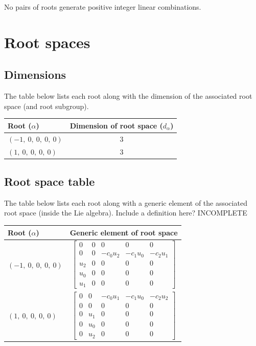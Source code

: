 \documentclass[11pt]{article}
\newcommand{\noi}{\noindent}
\theoremstyle{definition}
\begin{document}
\noindent No pairs of roots generate positive integer linear combinations.


\newpage
\section{Root spaces}

\subsection{Dimensions}

The table below lists each root along with the dimension of the associated root space (and root subgroup).

\bigskip

\noindent \begin{tabular}{|l|c|}
    \hline
    \textbf{Root ($\alpha$)} & \textbf{Dimension of root space ($d_{\alpha}$)} \\
    \hline
    $\left( -1, \  0, \  0, \  0, \  0\right)$ & 3 \\
    \hline
    $\left( 1, \  0, \  0, \  0, \  0\right)$ & 3 \\
    \hline
\end{tabular}


\subsection{Root space table}

\noi The table below lists each root along with a generic element of the associated root space (inside the Lie algebra). Include a definition here? INCOMPLETE

\bigskip

\noindent \begin{tabular}{|l|c|}
    \hline
    \textbf{Root ($\alpha$)} & \textbf{Generic element of root space} \\
    \hline
    $\left( -1, \  0, \  0, \  0, \  0\right)$ & $\left[\begin{matrix}0 & 0 & 0 & 0 & 0\\0 & 0 & - c_{0} u_{2} & - c_{1} u_{0} & - c_{2} u_{1}\\u_{2} & 0 & 0 & 0 & 0\\u_{0} & 0 & 0 & 0 & 0\\u_{1} & 0 & 0 & 0 & 0\end{matrix}\right]$ \\
    \hline
    $\left( 1, \  0, \  0, \  0, \  0\right)$ & $\left[\begin{matrix}0 & 0 & - c_{0} u_{1} & - c_{1} u_{0} & - c_{2} u_{2}\\0 & 0 & 0 & 0 & 0\\0 & u_{1} & 0 & 0 & 0\\0 & u_{0} & 0 & 0 & 0\\0 & u_{2} & 0 & 0 & 0\end{matrix}\right]$ \\
    \hline
\end{tabular}
\end{document}
